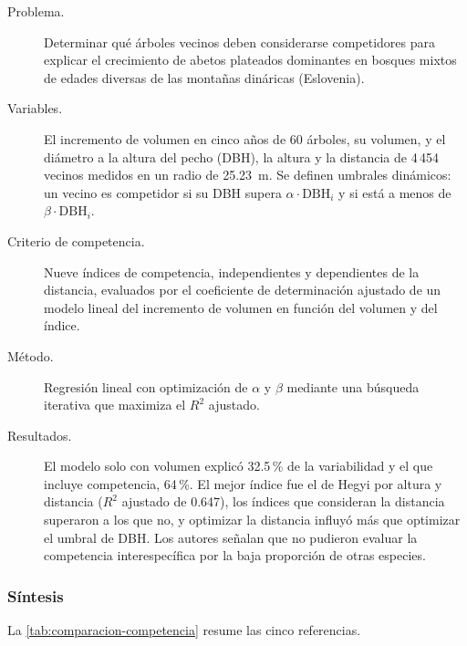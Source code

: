 \begin{description}
  \item[Problema.] Determinar qué árboles vecinos deben considerarse competidores para explicar el crecimiento de abetos plateados dominantes en bosques mixtos de edades diversas de las montañas dináricas (Eslovenia).
  \item[Variables.] El incremento de volumen en cinco años de 60 árboles, su volumen, y el diámetro a la altura del pecho (DBH), la altura y la distancia de 4\,454 vecinos medidos en un radio de 25.23~m. Se definen umbrales dinámicos: un vecino es competidor si su DBH supera $\alpha\cdot\mathrm{DBH}_i$ y si está a menos de $\beta\cdot\mathrm{DBH}_i$.
  \item[Criterio de competencia.] Nueve índices de competencia, independientes y dependientes de la distancia, evaluados por el coeficiente de determinación ajustado de un modelo lineal del incremento de volumen en función del volumen y del índice.
  \item[Método.] Regresión lineal con optimización de $\alpha$ y $\beta$ mediante una búsqueda iterativa que maximiza el $R^{2}$ ajustado.
  \item[Resultados.] El modelo solo con volumen explicó 32.5\,\% de la variabilidad y el que incluye competencia, 64\,\%. El mejor índice fue el de Hegyi por altura y distancia ($R^{2}$ ajustado de 0.647), los índices que consideran la distancia superaron a los que no, y optimizar la distancia influyó más que optimizar el umbral de DBH. Los autores señalan que no pudieron evaluar la competencia interespecífica por la baja proporción de otras especies.
\end{description}

\subsubsection{Síntesis}

La \cref{tab:comparacion-competencia} resume las cinco referencias.

